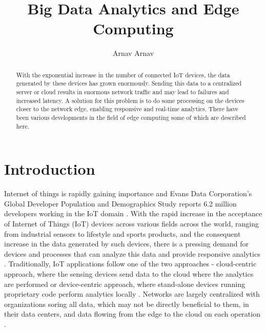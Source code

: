 \documentclass[sigconf]{acmart}
\begin{document}
\title{Big Data Analytics and Edge Computing}


\author{Arnav Arnav}

\begin{abstract}
With the exponential increase in the number of connected IoT devices, the data generated by these devices has grown enormously. Sending this data to a centralized server or cloud results in enormous network traffic and may lead to failures and increased latency. A solution for this problem is to do some processing on the devices closer to the network edge, enabling responsive and real-time analytics. There have been various developments in the field of edge computing some of which are described here.
\end{abstract}

\maketitle
\section{Introduction}
Internet of things is rapidly gaining importance and Evans Data Corporation’s Global Developer Population and Demographics Study reports 6.2 million developers working in the IoT domain \cite{ibm-data-streaming-analytics}. With the rapid increase in the acceptance of Internet of Things (IoT) devices across various fields across the world, ranging from industrial sensors to lifestyle and sports products, and the consequent increase in the data generated by such devices, there is a pressing demand for devices and processes that can analyze this data and provide responsive analytics \cite{ieee-iot-cloud-analytics-newsletter}. Traditionally, IoT applications follow one of the two approaches - cloud-centric approach, where the sensing devices send data to the cloud where the analytics are performed or device-centric approach, where stand-alone devices running proprietary code perform analytics locally \cite{ieee-iot-cloud-analytics-newsletter}. Networks are largely centralized with  organizations soring all data, which may not be directly beneficial to them, in their data centers, and data flowing from the edge to the cloud on each operation \cite{ibm-iot-edge}.
\end{document}
